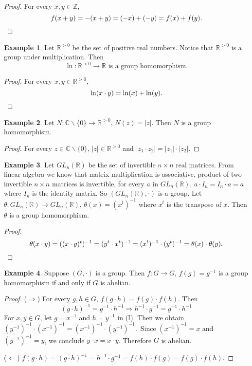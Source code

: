 \documentclass{article}
\theoremstyle{plain}
\theoremstyle{definition}
\newtheorem{example}{Example}
\newcommand{\FR}{\mathbb{R}}
\newcommand{\FC}{\mathbb{C}}
\begin{document}
\begin{proof}
    For every $x,y\in\mathbb{Z}$,
    \[f(x+y)=-(x+y)=(-x)+(-y)=f(x)+f(y).\qedhere\]
\end{proof}

\begin{example}
    Let $\FR^{>0}$ be the set of positive
    real numbers. Notice that $\FR^{>0}$ is a group
    under multiplication. Then 
    \[\ln:\FR^{>0}\to\FR\text{ is a group homomorphism.}\]
\end{example}

\begin{proof}
    For every $x,y\in\FR^{>0}$,
    \[\ln(x\cdot y)=\ln(x)+\ln(y).\qedhere\]
\end{proof}

\begin{example}
    Let $N:\FC\backslash\{0\}\to\FR^{>0}$, $N(z)=|z|$. Then 
    $N$ is a group homomorphism.
\end{example}

\begin{proof}
    For every $z\in\FC\backslash\{0\}$, $|z|\in\FR^{>0}$
    and $|z_1\cdot z_2|=|z_1|\cdot|z_2|$.
\end{proof}

\begin{example}
    Let $GL_n(\FR)$ be the set of invertible $n\times n$
    real matrices. From linear algebra we know that matrix
    multiplication is associative, product of two
    invertible $n\times n$ matrices is invertible, for
    every $a$ in $GL_n(\FR)$, $a\cdot I_n=I_n\cdot a=a$
    where $I_n$ is the identity matrix.
    So $(GL_n(\FR),\cdot)$ is a group. Let $\theta:GL_n(\FR)\to GL_n(\FR)$,
    $\theta(x)=(x^t)^{-1}$ where $x^t$ is the transpose of $x$. Then
    $\theta$ is a group homomorphism.
\end{example}

\begin{proof}
    \[\theta(x\cdot y)=((x\cdot y)^t)^{-1}=(y^t\cdot x^t)^{-1}=(x^t)^{-1}\cdot(y^t)^{-1}=\theta(x)\cdot\theta(y).\qedhere\]
\end{proof}

\begin{example}
    Suppose $(G,\cdot)$ is a group. Then $f:G\to G$, $f(g)=g^{-1}$
    is a group homomorphism if and only if $G$ is abelian.
\end{example}

\begin{proof}
    ($\Rightarrow$) For every $g,h\in G$, $f(g\cdot h)=f(g)\cdot f(h)$.
    Then 
    \begin{equation}
        (g\cdot h)^{-1}=g^{-1}\cdot h^{-1}\Rightarrow h^{-1}\cdot g^{-1}=g^{-1}\cdot h^{-1}\tag{(I)}
    \end{equation}
    For $x,y\in G$, let $g=x^{-1}$ and $h=y^{-1}$ in (I). Then
    we obtain $(y^{-1})^{-1}\cdot (x^{-1})^{-1}=(x^{-1})^{-1}\cdot(y^{-1})^{-1}$.\
    Since $(x^{-1})^{-1}=x$ and $(y^{-1})^{-1}=y$, we conclude
    $y\cdot x=x\cdot y$. Therefore $G$ is abelian.

    ($\Leftarrow$) $f(g\cdot h)=(g\cdot h)^{-1}=h^{-1}\cdot g^{-1}=f(h)\cdot f(g)=f(g)\cdot f(h)$.
\end{proof}
\end{document}
